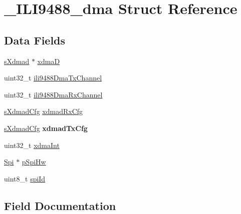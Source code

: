 \hypertarget{struct__ILI9488__dma}{}\section{\+\_\+\+I\+L\+I9488\+\_\+dma Struct Reference}
\label{struct__ILI9488__dma}
\subsection*{Data Fields}
\begin{DoxyCompactItemize}
\item 
\mbox{\hyperlink{group__dmad__structs_gaf2c13151514615a6beb35c0d868a5053}{s\+Xdmad}} $\ast$ \mbox{\hyperlink{struct__ILI9488__dma_a491325a84721327f7140fa5aa5fb9669}{xdmaD}}
\item 
uint32\+\_\+t \mbox{\hyperlink{struct__ILI9488__dma_ac86a460f0aabb47145e2d507f1c0e235}{ili9488\+Dma\+Tx\+Channel}}
\item 
uint32\+\_\+t \mbox{\hyperlink{struct__ILI9488__dma_a6238e93274556d0452b5edc130781ea5}{ili9488\+Dma\+Rx\+Channel}}
\item 
\mbox{\hyperlink{struct__XdmadCfg}{s\+Xdmad\+Cfg}} \mbox{\hyperlink{struct__ILI9488__dma_a4a717f1ae1ecbca415e952f545ce34a8}{xdmad\+Rx\+Cfg}}
\item 
\mbox{\label{struct__ILI9488__dma_aa022246915c6947cf73dba74e7ee70c4}} 
\mbox{\hyperlink{struct__XdmadCfg}{s\+Xdmad\+Cfg}} {\bfseries xdmad\+Tx\+Cfg}
\item 
uint32\+\_\+t \mbox{\hyperlink{struct__ILI9488__dma_a868976292a3596bb1d1aba38bec02637}{xdma\+Int}}
\item 
\mbox{\hyperlink{structSpi}{Spi}} $\ast$ \mbox{\hyperlink{struct__ILI9488__dma_af7b405a03b587ddbe83dd8b6cd7b67f9}{p\+Spi\+Hw}}
\item 
uint8\+\_\+t \mbox{\hyperlink{struct__ILI9488__dma_af814325d4ce3d9f8238e346f19f75ebb}{spi\+Id}}
\end{DoxyCompactItemize}


\subsection{Field Documentation}
\mbox{\label{struct__ILI9488__dma_a6238e93274556d0452b5edc130781ea5}} 
